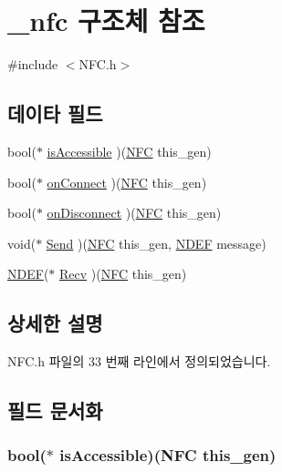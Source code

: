 \hypertarget{struct__nfc}{\section{\-\_\-nfc 구조체 참조}
\label{struct__nfc}
}


{\ttfamily \#include $<$N\-F\-C.\-h$>$}

\subsection*{데이타 필드}
\begin{DoxyCompactItemize}
\item 
bool($\ast$ \hyperlink{struct__nfc_ac1c45ebcef1f0a82a2bc140a9a2d572b}{is\-Accessible} )(\hyperlink{namespace_3global_scope_4_struct_n_f_c}{N\-F\-C} this\-\_\-gen)
\item 
bool($\ast$ \hyperlink{struct__nfc_a070219e871b65c63119b2b9fcf2f7e40}{on\-Connect} )(\hyperlink{namespace_3global_scope_4_struct_n_f_c}{N\-F\-C} this\-\_\-gen)
\item 
bool($\ast$ \hyperlink{struct__nfc_a3c638b599b78d063fd8472ea015597e0}{on\-Disconnect} )(\hyperlink{namespace_3global_scope_4_struct_n_f_c}{N\-F\-C} this\-\_\-gen)
\item 
void($\ast$ \hyperlink{struct__nfc_aca64adb6ba471126be23b84178dbd887}{Send} )(\hyperlink{namespace_3global_scope_4_struct_n_f_c}{N\-F\-C} this\-\_\-gen, \hyperlink{_n_f_c_8h_struct_n_d_e_f}{N\-D\-E\-F} message)
\item 
\hyperlink{_n_f_c_8h_struct_n_d_e_f}{N\-D\-E\-F}($\ast$ \hyperlink{struct__nfc_a2c24741e6d306b941e4b30559e5b7a52}{Recv} )(\hyperlink{namespace_3global_scope_4_struct_n_f_c}{N\-F\-C} this\-\_\-gen)
\end{DoxyCompactItemize}


\subsection{상세한 설명}


N\-F\-C.\-h 파일의 33 번째 라인에서 정의되었습니다.



\subsection{필드 문서화}
\hypertarget{struct__nfc_ac1c45ebcef1f0a82a2bc140a9a2d572b}{
\subsubsection[{is\-Accessible}]{\setlength{\rightskip}{0pt plus 5cm}bool($\ast$  is\-Accessible)({\bf N\-F\-C} this\-\_\-gen)}}\label{struct__nfc_ac1c45ebcef1f0a82a2bc140a9a2d572b}


